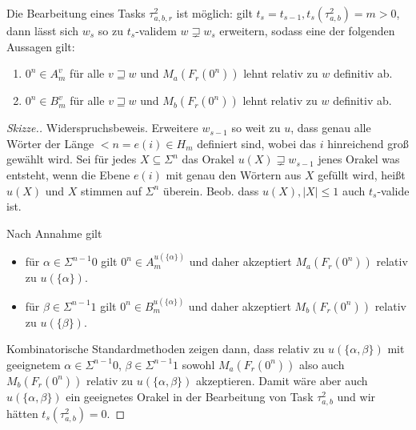 \begin{lemma}
    Die Bearbeitung eines Tasks $\tau^2_{a,b,r}$ ist möglich: gilt $t_s=t_{s-1}, t_{s}(\tau^2_{a,b})=m>0$, dann lässt sich $w_{s}$ so zu $t_{s}$-validem $w\sqsupsetneq w_{s}$ erweitern, sodass eine der folgenden Aussagen gilt:
    \begin{enumerate}[nosep,endpenalty=10000]
        \item $0^n\in A_m^v$ für alle $v\sqsupseteq w$ und $M_a(F_r(0^n))$ lehnt relativ zu $w$ definitiv ab.
        \item $0^n\in B_m^v$ für alle $v\sqsupseteq w$ und $M_b(F_r(0^n))$ lehnt relativ zu $w$ definitiv ab.
    \end{enumerate}
\end{lemma}
\begin{proof}[Skizze.]
    Widerspruchsbeweis. Erweitere $w_{s-1}$ so weit zu $u$, dass genau alle Wörter der Länge $<n=e(i)\in H_m$ definiert sind, wobei das $i$ hinreichend groß gewählt wird. Sei für jedes $X\subseteq \Sigma^n$ das Orakel $u(X)\sqsupsetneq w_{s-1}$ jenes Orakel was entsteht, wenn die Ebene $e(i)$ mit genau den Wörtern aus $X$ gefüllt wird, heißt $u(X)$ und $X$ stimmen auf $\Sigma^n$ überein. Beob. dass $u(X), |X|\leq 1$ auch $t_{s}$-valide ist.

    Nach Annahme gilt
    \begin{itemize}[nosep]
        \item für $\alpha\in \Sigma^{n-1}0$ gilt $0^n\in A_m^{u(\{\alpha\})}$ und daher akzeptiert $M_a(F_r(0^n))$ relativ zu $u(\{\alpha\})$.
        \item für $\beta\in \Sigma^{n-1}1$ gilt $0^n\in B_m^{u(\{\alpha\})}$ und daher akzeptiert $M_b(F_r(0^n))$ relativ zu $u(\{\beta\})$.
    \end{itemize}
    Kombinatorische Standardmethoden zeigen dann, dass relativ zu $u(\{\alpha,\beta\})$ mit geeignetem $\alpha\in\Sigma^{n-1}0$, $\beta\in\Sigma^{n-1}1$ sowohl $M_a(F_r(0^n))$ also auch $M_b(F_r(0^n))$ relativ zu $u(\{\alpha,\beta\})$ akzeptieren.
    Damit wäre aber auch $u(\{\alpha,\beta\})$ ein geeignetes Orakel in der Bearbeitung von Task $\tau^2_{a,b}$ und wir hätten $t_{s}(\tau^2_{a,b})=0$.
\end{proof}
